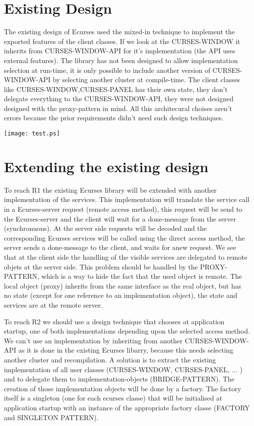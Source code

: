 \documentclass{article}
\begin{document}
\section{Existing Design}
The existing design of Ecurses used the mixed-in technique to implement the exported features of the client classes. If we look at the CURSES-WINDOW it inherits from CURSES-WINDOW-API for it's implementation (the API uses external features). 
The library has not been designed to allow implementation selection at run-time, it is only possible to include another version of CURSES-WINDOW-API by selecting another cluster at compile-time. 
The client classes like CURSES-WINDOW,CURSES-PANEL has their own state, they don't delegate everything to the CURSES-WINDOW-API, they were not designed designed with the proxy-pattern in mind. 
All this architecural choises aren't errors because the prior requirements didn't need such design techniques.


\texttt{[image: test.ps]}

 
\section{Extending the existing design}
To reach R1 the existing Ecurses library will be extended with another implementation of the services. This implementation will  translate the service call in a Ecurses-server request (remote access method), this request will be send to the Ecurses-server and the client will wait for a done-message from the server (synchronuous). At the server side requests will be decoded and the corresponding Ecurses services will be called using the direct access method, the server sends a done-message to the client, and waits for anew request. We see that at the client side the handling of the visible services are delegated to remote objets at the server side. This problem should be handled by the PROXY-PATTERN, which is a way to hide the fact that the used object is remote. The local object (proxy) inherits from the same interface as the real object, but has no state (except for one reference to an implementation object), the state and services are at the remote server.

To reach R2 we should use a design technique that chooses at application startup, one of both implementations depending upon the selected access method. We can't use an implementation by inheriting from another CURSES-WINDOW-API as it is done in the existing Ecurses libarry, because this needs selecting another cluster and recompilation. A solution is to extract the existing implementation of all user classes (CURSES-WINDOW, CURSES-PANEL, ... ) and to delegate them to implementation-objects (BRIDGE-PATTERN). The creation of those implementation objects will be done by a factory. The factory itself is a singleton (one for each ecurses classe) that will be initialised at application startup with an instance of the appropriate factory classe (FACTORY and SINGLETON PATTERN).
\end{document}
